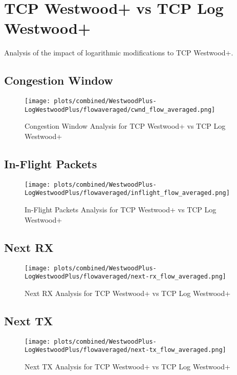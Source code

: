 \documentclass[12pt,a4paper]{report}
\begin{document}
\section{TCP Westwood+ vs TCP Log Westwood+}
\noindent Analysis of the impact of logarithmic modifications to TCP Westwood+.


\newpage
\subsection{Congestion Window}
\begin{figure}[H]
\centering
\texttt{[image: plots/combined/WestwoodPlus-LogWestwoodPlus/flowaveraged/cwnd\_flow\_averaged.png]}
\caption{Congestion Window Analysis for TCP Westwood+ vs TCP Log Westwood+}
\label{fig:WestwoodPlus-LogWestwoodPlus_cwnd}
\end{figure}

\newpage

\newpage
\subsection{In-Flight Packets}
\begin{figure}[H]
\centering
\texttt{[image: plots/combined/WestwoodPlus-LogWestwoodPlus/flowaveraged/inflight\_flow\_averaged.png]}
\caption{In-Flight Packets Analysis for TCP Westwood+ vs TCP Log Westwood+}
\label{fig:WestwoodPlus-LogWestwoodPlus_inflight}
\end{figure}

\newpage

\newpage
\subsection{Next RX}
\begin{figure}[H]
\centering
\texttt{[image: plots/combined/WestwoodPlus-LogWestwoodPlus/flowaveraged/next-rx\_flow\_averaged.png]}
\caption{Next RX Analysis for TCP Westwood+ vs TCP Log Westwood+}
\label{fig:WestwoodPlus-LogWestwoodPlus_next-rx}
\end{figure}

\newpage

\newpage
\subsection{Next TX}
\begin{figure}[H]
\centering
\texttt{[image: plots/combined/WestwoodPlus-LogWestwoodPlus/flowaveraged/next-tx\_flow\_averaged.png]}
\caption{Next TX Analysis for TCP Westwood+ vs TCP Log Westwood+}
\label{fig:WestwoodPlus-LogWestwoodPlus_next-tx}
\end{figure}
\end{document}
